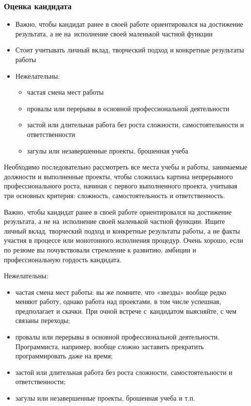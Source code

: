 \documentclass{../industrial-development}
\begin{document}
\begin{frame} \frametitle{Оценка кандидата}
	\begin{itemize}
		
		\item Важно, чтобы кандидат ранее в своей работе ориентировался на достижение результата, а не на~исполнение своей маленькой частной функции
		\item Стоит учитывать личный вклад, творческий подход и конкретные результаты работы
		\item Нежелательны:
		\begin{itemize}
			\item частая смена мест работы
			\item	провалы или перерывы в основной профессиональной деятельности
			\item	застой или длительная работа без роста сложности, самостоятельности и ответственности
			\item загулы или незавершенные проекты, брошенная учеба
			
		\end{itemize}
	\end{itemize}
\end{frame}

\lecturenotes

Необходимо последовательно рассмотреть все места учебы и работы, занимаемые должности и выполненные проекты, чтобы сложилась картина непрерывного профессионального роста, начиная с первого выполненного проекта, учитывая три основных критерия: сложность, самостоятельность и ответственность.

Важно, чтобы кандидат ранее в своей работе ориентировался на достижение результата, а не на~исполнение своей маленькой частной функции. Ищите личный вклад, творческий подход и конкретные результаты работы, а не факты участия в процессе или монотонного исполнения процедур. Очень хорошо, если по резюме вы почувствовали стремление к развитию, амбиции и профессиональную гордость кандидата.

Нежелательны:
\begin{itemize}
	\item	частая смена мест работы: вы же помните, что «звезды» вообще редко меняют работу, однако работа над проектами, в том числе успешная, предполагает и скачки. При очной встрече с~кандидатом выясняйте, с чем связаны переходы;
	
	\item	провалы или перерывы в основной профессиональной деятельности. Программиста, например, вообще сложно заставить прекратить программировать даже на время;
	
	\item	застой или длительная работа без роста сложности, самостоятельности и ответственности;
	
	\item	загулы или незавершенные проекты, брошенная учеба и т.п.
\end{itemize}
\end{document}
